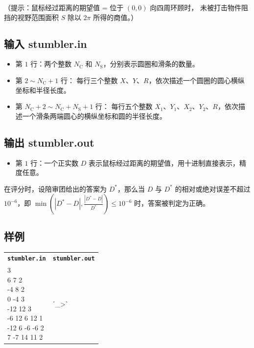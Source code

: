 \documentclass[UTF8, 11pt, a4paper]{article}
\begin{document}
（提示：鼠标经过距离的期望值 = 位于 $(0,0)$ 向四周环顾时，%
未被打击物件阻挡的视野范围面积 $S$ 除以 $2\pi$ 所得的商值。）

\subsection*{输入 \makebox[0.5em]{} \small{stumbler.in}}
\begin{itemize}
    \item 第 $1$ 行：两个整数 $N_\mathrm{C}$ 和 $N_\mathrm{S}$，分别表示圆圈和滑条的数量。
    \item 第 $2 \sim N_\mathrm{C} + 1$ 行：%
        每行三个整数 $X$、$Y$、$R$，依次描述一个圆圈的圆心横纵坐标和半径长度。
    \item 第 $N_\mathrm{C} + 2 \sim N_\mathrm{C} + N_\mathrm{S} + 1$ 行：%
        每行五个整数 $X_1$、$Y_1$、$X_2$、$Y_2$、$R$，依次描述一个滑条两端圆心的横纵坐标和圆的半径长度。
\end{itemize}

\subsection*{输出 \makebox[0.5em]{} \small{stumbler.out}}
\begin{itemize}
    \item 第 $1$ 行：一个正实数 $D$ 表示鼠标经过距离的期望值，用十进制直接表示，精度任意。
\end{itemize}

在评分时，设陪审团给出的答案为 $D^*$，那么当 $D$ 与 $D^*$ 的相对或绝对误差不超过 %
$10^{-6}$，即 $\min\left(|D^* - D|, \frac{|D^* - D|}{D^*}\right) \leq 10^{-6}$ 时，答案被判定为正确。

\subsection*{样例}
\begin{table}[h]\centering
\begin{tabularx}{0.8 \textwidth}{|X|X|}
\hline
\texttt{\textbf{stumbler.in}} & \texttt{\textbf{stumbler.out}} \\ \hline
{\ttfamily
4 3\newline
6 7 2\newline
-4 8 2\newline
0 -4 3\newline
-12 12 3\newline
-6 12 6 12 1\newline
-12 6 -6 -6 2\newline
7 -7 14 11 2
} & {\ttfamily
ˊ\_>ˋ
}
\\ \hline
\end{tabularx}\end{table}
\end{document}
